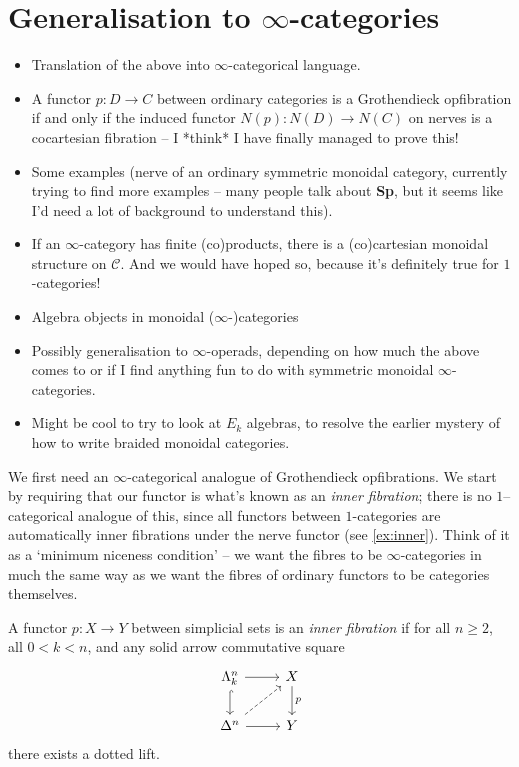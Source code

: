 \documentclass{MetricNotes2023}
\begin{document}
\section{Generalisation to \(\infty\)-categories}

\begin{itemize}
\item Translation of the above into \(\infty\)-categorical language.
\item A functor \(p : D \to C\) between ordinary categories is a Grothendieck opfibration if and only if the induced functor \(N(p) : N(D) \to N(C)\) on nerves is a cocartesian fibration -- I *think* I have finally managed to prove this!
\item Some examples (nerve of an ordinary symmetric monoidal category, currently trying to find more examples -- many people talk about \textbf{Sp}, but it seems like I'd need a lot of background to understand this).
\item If an \(\infty\)-category has finite (co)products, there is a (co)cartesian monoidal structure on \(\mathcal{C}\). And we would have hoped so, because it's definitely true for \(1\)-categories!
\item Algebra objects in monoidal (\(\infty\)-)categories
\item Possibly generalisation to \(\infty\)-operads, depending on how much the above comes to or if I find anything fun to do with symmetric monoidal \(\infty\)-categories. 
\item Might be cool to try to look at \(E_k\) algebras, to resolve the earlier mystery of how to write braided monoidal categories.
\end{itemize}

We first need an \(\infty\)-categorical analogue of Grothendieck opfibrations. We start by requiring that our functor is what's known as an \textit{inner fibration}; there is no \(1\)--categorical analogue of this, since all functors between \(1\)-categories are automatically inner fibrations under the nerve functor (see \ref{ex:inner}). Think of it as a `minimum niceness condition' -- we want the fibres to be \(\infty\)-categories in much the same way as we want the fibres of ordinary functors to be categories themselves. 

\begin{definition}
A functor \(p : X \to Y\) between simplicial sets is an \textit{inner fibration} if for all \(n \geq 2\), all \(0 < k < n\), and any solid arrow commutative square 
\[\begin{tikzcd}
\Lambda^n_k \arrow[r, ""] \arrow[d, hookrightarrow, swap, ""]  & X \arrow[d, "p"]  \\
\Delta^n \arrow[r, swap, ""] \arrow[ur, dashrightarrow, swap, ""]  & Y
\end{tikzcd}\]
there exists a dotted lift. 
\end{definition}
\end{document}
